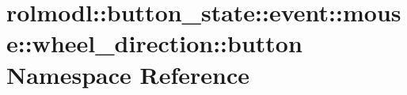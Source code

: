 \hypertarget{namespacerolmodl_1_1button__state_1_1event_1_1mouse_1_1wheel__direction_1_1button}{}\section{rolmodl\+::button\+\_\+state\+::event\+::mouse\+::wheel\+\_\+direction\+::button Namespace Reference}
\label{namespacerolmodl_1_1button__state_1_1event_1_1mouse_1_1wheel__direction_1_1button}
